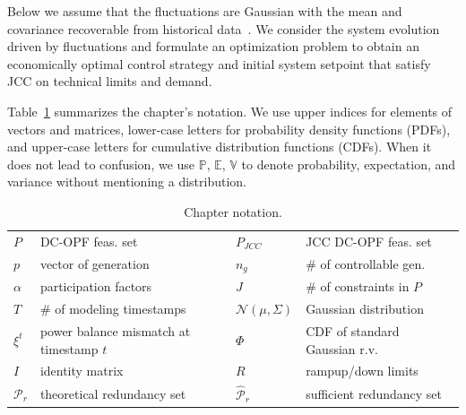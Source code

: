 Below we assume that the fluctuations are Gaussian with the mean and covariance recoverable from historical data~\cite{roald2017chance, owen2019importance}.
We consider the system evolution driven by fluctuations and formulate an optimization problem to obtain an economically optimal control strategy and initial system setpoint that satisfy JCC on technical limits and demand.

Table~\ref{tab:notation} summarizes the chapter's notation. We use upper indices for elements of vectors and matrices, lower-case letters for probability density functions (PDFs), and upper-case letters for cumulative distribution functions (CDFs). When it does not lead to confusion, we use $\mathbb{P}$, $\mathbb{E}$, $\mathbb{V}$ to denote probability, expectation, and variance without mentioning a distribution. 

\begin{table}[t]
    \centering
    \caption{Chapter notation.}
    \begin{tabularx}{\textwidth}{|m{1cm}|X|m{1.6cm}|X|}
        \toprule 
        ${P}$ & DC-OPF feas. set & $P_{JCC}$ & JCC DC-OPF feas. set \\
        $p$ & vector of generation & $n_g$ & \# of controllable gen. \\
        $\alpha$ & participation factors & $J$ & \# of constraints in $P$ \\
        $T$ & \# of modeling timestamps & $\mathcal{N}(\mu, \Sigma)$ & Gaussian distribution \\  
        $\xi^t$  & power balance mismatch at timestamp $t$ & $\Phi$ & CDF of standard Gaussian r.v. \\
        $I$ & identity matrix & $R$ & rampup/down limits \\
        $\mathcal{P}_r$ & theoretical redundancy set & $\hat{\mathcal{P}}_r$ & sufficient redundancy set\\
        \bottomrule
    \end{tabularx}
    \label{tab:notation}
\end{table}

